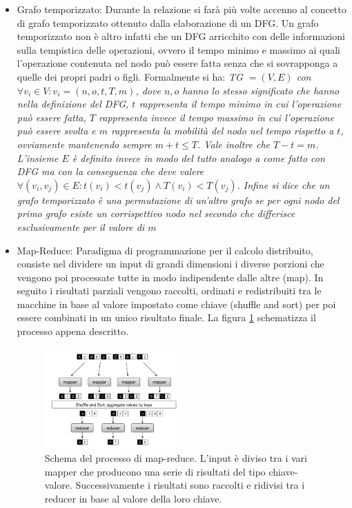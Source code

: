 \documentclass[]{IEEEtran}
\begin{document}
\begin{itemize}
	\item Grafo temporizzato: Durante la relazione si farà più volte accenno al concetto di grafo temporizzato ottenuto dalla elaborazione di un DFG. Un grafo temporizzato non è altro infatti che un DFG arricchito con delle informazioni sulla tempistica delle operazioni, ovvero il tempo minimo e massimo ai quali l'operazione contenuta nel nodo può essere fatta senza che si sovrapponga a quelle dei propri padri o figli. Formalmente si ha:
	\it{TG} \normalfont $=(V,E)$ con $\forall v_i\in V : v_i = (n,o,t,T,m)$, dove $n,o$ hanno lo stesso significato che hanno nella definizione del DFG, $t$ rappresenta il tempo \emph{minimo} in cui l'operazione può essere fatta, $T$ rappresenta invece il tempo \emph{massimo} in cui l'operazione può essere svolta e $m$ rappresenta la mobilità del nodo nel tempo rispetto a $t$, ovviamente mantenendo sempre $m+t\le T$. Vale inoltre che $T - t = m$. L'insieme $E$ è definito invece in modo del tutto analogo a come fatto con DFG ma con la conseguenza che deve valere $\forall (v_i,v_j) \in E : t(v_i)<t(v_j) \land T(v_i)<T(v_j)$.
	Infine si dice che un grafo temporizzato è una \emph{permutazione} di un'altro grafo se per ogni nodo del primo grafo esiste un corrispettivo nodo nel secondo che differisce esclusivamente per il valore di $m$
	
	\item Map-Reduce\cite{MAPRED}: Paradigma di programmazione per il calcolo distribuito, consiste nel dividere un input di grandi dimensioni i diverse porzioni che vengono poi processate tutte in modo indipendente dalle altre (map). In seguito i risultati parziali vengono raccolti, ordinati e redistribuiti tra le macchine in base al valore impostato come chiave (shuffle and sort) per poi essere combinati in un unico risultato finale. La figura \ref{mapred} schematizza il processo appena descritto.
	\begin{figure}[htp]
		\includegraphics[width=0.5\textwidth]{images/mapred.png}
		\caption{Schema del processo di map-reduce. L'input è diviso tra i vari mapper che producono una serie di risultati del tipo chiave-valore. Successivamente i risultati sono raccolti e ridivisi tra i reducer in base al valore della loro chiave.}
		\label{mapred}
	\end{figure}
	

\end{itemize}
\end{document}
